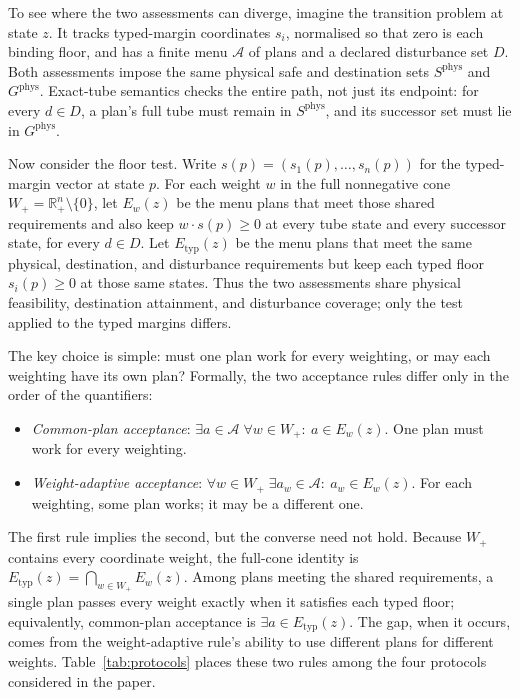 \documentclass[preprint,11pt,authoryear]{elsarticle}
\theoremstyle{definition}
\theoremstyle{remark}
\newcommand{\Etyp}{E_{\mathrm{typ}}}
\newcommand{\Wp}{W_+}
\newcommand{\Rp}{\mathbb{R}^n_+}
\begin{document}
To see where the two assessments can diverge, imagine the transition problem at state $z$. It tracks typed-margin coordinates $s_i$, normalised so that zero is each binding floor, and has a finite menu $\mathcal A$ of plans and a declared disturbance set $D$. Both assessments impose the same physical safe and destination sets $S^{\mathrm{phys}}$ and $G^{\mathrm{phys}}$. Exact-tube semantics checks the entire path, not just its endpoint: for every $d\in D$, a plan's full tube must remain in $S^{\mathrm{phys}}$, and its successor set must lie in $G^{\mathrm{phys}}$.

\begin{samepage}
Now consider the floor test. Write $s(p)=(s_1(p),\dots,s_n(p))$ for the typed-margin vector at state $p$. For each weight $w$ in the full nonnegative cone $\Wp=\Rp\setminus\{0\}$, let $E_w(z)$ be the menu plans that meet those shared requirements and also keep $w\cdot s(p)\ge0$ at every tube state and every successor state, for every $d\in D$. Let $\Etyp(z)$ be the menu plans that meet the same physical, destination, and disturbance requirements but keep each typed floor $s_i(p)\ge0$ at those same states. Thus the two assessments share physical feasibility, destination attainment, and disturbance coverage; only the test applied to the typed margins differs.
\end{samepage}

The key choice is simple: must one plan work for every weighting, or may each weighting have its own plan? Formally, the two acceptance rules differ only in the order of the quantifiers:
\begin{itemize}[leftmargin=2em]
\item \emph{Common-plan acceptance}: $\exists a\in\mathcal A\;\forall w\in\Wp:\ a\in E_w(z)$. One plan must work for every weighting.
\item \emph{Weight-adaptive acceptance}: $\forall w\in\Wp\;\exists a_w\in\mathcal A:\ a_w\in E_w(z)$. For each weighting, some plan works; it may be a different one.
\end{itemize}
The first rule implies the second, but the converse need not hold. Because $\Wp$ contains every coordinate weight, the full-cone identity is $\Etyp(z)=\bigcap_{w\in\Wp}E_w(z)$. Among plans meeting the shared requirements, a single plan passes every weight exactly when it satisfies each typed floor; equivalently, common-plan acceptance is $\exists a\in\Etyp(z)$. The gap, when it occurs, comes from the weight-adaptive rule's ability to use different plans for different weights. Table~\ref{tab:protocols} places these two rules among the four protocols considered in the paper.
\end{document}
